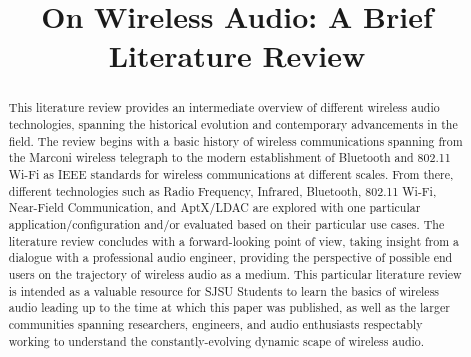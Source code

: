 \documentclass[conference]{IEEEtran}
\begin{document}
\title{On Wireless Audio: A Brief Literature Review}

\author{
    \and
    \and
}

\maketitle

\begin{abstract}
    This literature review provides an intermediate overview of
    different wireless audio technologies, spanning the historical evolution and
    contemporary advancements in the field. The review
    begins with a basic history of wireless communications spanning from
    the Marconi wireless telegraph to the modern establishment of
    Bluetooth and 802.11 Wi-Fi as IEEE standards for wireless
    communications at different scales. From there, different
    technologies such as Radio Frequency, Infrared, Bluetooth, 802.11
    Wi-Fi, Near-Field Communication, and AptX/LDAC are explored with one
    particular application/configuration and/or evaluated based on their
    particular use cases. The literature review concludes with a
    forward-looking point of view, taking insight from a dialogue with a
    professional audio engineer, providing the perspective of possible end users on the
    trajectory of wireless audio as a medium. This particular literature
    review is intended as a valuable resource for SJSU Students to learn
    the basics of wireless audio leading up to the time at which this
    paper was published, as well as the larger communities spanning
    researchers, engineers, and audio enthusiasts respectably working to
    understand the constantly-evolving dynamic scape of wireless audio.
\end{abstract}
\end{document}
